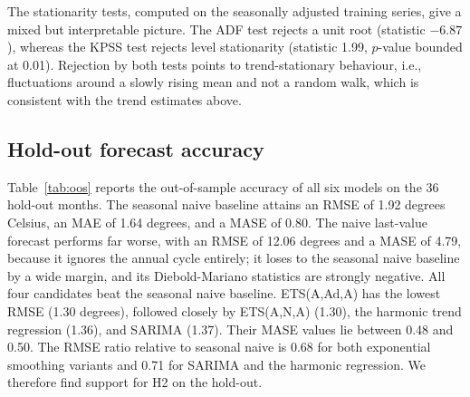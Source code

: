 

The stationarity tests, computed on the seasonally adjusted training series, give a mixed but interpretable picture. The ADF test rejects a unit root (statistic $-6.87$), whereas the KPSS test rejects level stationarity (statistic 1.99, $p$-value bounded at 0.01).
Rejection by both tests points to trend-stationary behaviour, i.e., fluctuations around a slowly rising mean and not a random walk, which is consistent with the trend estimates above.



\subsection{Hold-out forecast accuracy}

Table~\ref{tab:oos} reports the out-of-sample accuracy of all six models on the 36 hold-out months. The seasonal naive baseline attains an RMSE of 1.92 degrees Celsius, an MAE of 1.64 degrees, and a MASE of 0.80.
The naive last-value forecast performs far worse, with an RMSE of 12.06 degrees and a MASE of 4.79, because it ignores the annual cycle entirely; it loses to the seasonal naive baseline by a wide margin, and its Diebold-Mariano statistics are strongly negative.
All four candidates beat the seasonal naive baseline. ETS(A,Ad,A) has the lowest RMSE (1.30 degrees), followed closely by ETS(A,N,A) (1.30), the harmonic trend regression (1.36), and SARIMA (1.37). Their MASE values lie between 0.48 and 0.50.
The RMSE ratio relative to seasonal naive is 0.68 for both exponential smoothing variants and 0.71 for SARIMA and the harmonic regression.
We therefore find support for H2 on the hold-out.

